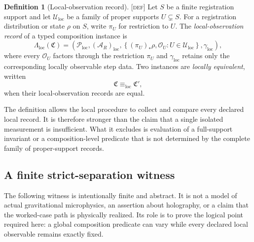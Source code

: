 \documentclass[11pt]{article}
\newcommand{\Pspace}{\ensuremath{\mathcal{P}}}
\newcommand{\ARspace}{\ensuremath{\mathcal{A}_{R}}}
\newcommand{\Defn}{\textsc{[def]}}
\theoremstyle{definition}
\newtheorem{sdefinition}{Definition}
\begin{document}
\begin{sdefinition}[Local-observation record]
\label{def:local-observation-record}
\Defn{} Let $S$ be a finite registration support and let
$\mathcal U_{\mathrm{loc}}$ be a family of proper supports
$U\subsetneq S$. For a registration distribution or state $\rho$ on $S$,
write $\pi_U$ for restriction to $U$. The \emph{local-observation record} of
a typed composition instance is
\begin{equation}
\Lambda_{\mathrm{loc}}(\mathfrak C)
=
\left(
\Pspace_{\mathrm{loc}},
(\ARspace)_{\mathrm{loc}},
\left\{
(\pi_U)_*\rho,\mathcal O_U
:
U\in\mathcal U_{\mathrm{loc}}
\right\},
\gamma_{\mathrm{loc}}
\right),
\label{eq:local-observation-record}
\end{equation}
where every $\mathcal O_U$ factors through the restriction $\pi_U$ and
$\gamma_{\mathrm{loc}}$ retains only the corresponding locally observable
step data. Two instances are \emph{locally equivalent}, written
\begin{equation}
\mathfrak C\equiv_{\mathrm{loc}}\mathfrak C',
\label{eq:local-equivalence}
\end{equation}
when their local-observation records are equal.
\end{sdefinition}

The definition allows the local procedure to collect and compare every declared
local record. It is therefore stronger than the claim that a single isolated
measurement is insufficient. What it excludes is evaluation of a full-support
invariant or a composition-level predicate that is not determined by the complete
family of proper-support records.

\subsection{A finite strict-separation witness}
\label{supp:finite-witness}

The following witness is intentionally finite and abstract. It is not a model of
actual gravitational microphysics, an assertion about holography, or a claim that
the worked-case path is physically realized. Its role is to prove the logical
point required here: a global composition predicate can vary while every declared
local observable remains exactly fixed.
\end{document}
